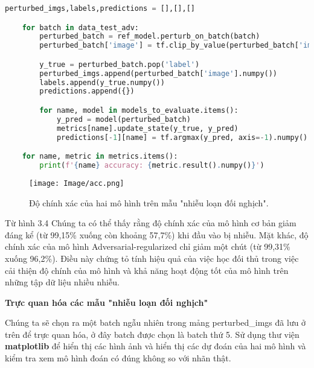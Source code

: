 \begin{lstlisting}[language = Python]
    perturbed_imgs,labels,predictions = [],[],[]

    for batch in data_test_adv:
        perturbed_batch = ref_model.perturb_on_batch(batch)
        perturbed_batch['image'] = tf.clip_by_value(perturbed_batch['image'], 0, 1)

        y_true = perturbed_batch.pop('label')
        perturbed_imgs.append(perturbed_batch['image'].numpy())
        labels.append(y_true.numpy())
        predictions.append({})

        for name, model in models_to_evaluate.items():
            y_pred = model(perturbed_batch)
            metrics[name].update_state(y_true, y_pred)
            predictions[-1][name] = tf.argmax(y_pred, axis=-1).numpy()

    for name, metric in metrics.items():
        print(f'{name} accuracy: {metric.result().numpy()}')

\end{lstlisting}

\begin{figure}[h!]
    \centering
    \texttt{[image: Image/acc.png]}
    \caption{Độ chính xác của hai mô hình trên mẫu "nhiễu loạn đối nghịch".}
    \label{fig 3.4:Độ chính xác của hai mô hình trên mẫu "nhiễu loạn đối nghịch".}
    
\end{figure}

Từ hình 3.4 Chúng ta có thể thấy rằng độ chính xác của mô hình cơ bản giảm đáng kể (từ 99,15\% xuống còn khoảng 57,7\%) khi đầu vào bị nhiễu. Mặt khác, 
độ chính xác của mô hình Adversarial-regularized chỉ giảm một chút (từ 99,31\% xuống 96,2\%). Điều này chứng tỏ tính hiệu quả của việc học đối thủ trong 
việc cải thiện độ chính của mô hình và khả năng hoạt động tốt của mô hình trên những tập dữ liệu nhiều nhiễu.

\textbf{Trực quan hóa các mẫu "nhiễu loạn đối nghịch"}

Chúng ta sẽ chọn ra một batch ngẫu nhiên trong mảng perturbed\_imgs đã lưu ở trên để trực quan hóa, ở đây batch được chọn là batch thứ 5.
Sử dụng thư viện \textbf{matplotlib} để hiển thị các hình ảnh và hiển thị các dự đoán của hai mô hình và kiểm tra xem mô hình đoán có đúng không so với
nhãn thật.


